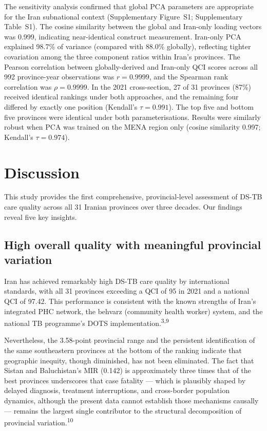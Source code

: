 \documentclass[12pt]{article}
\begin{document}
The sensitivity analysis confirmed that global PCA parameters are appropriate for the Iran subnational context (Supplementary Figure~S1; Supplementary Table~S1). The cosine similarity between the global and Iran-only loading vectors was 0.999, indicating near-identical construct measurement. Iran-only PCA explained 98.7\% of variance (compared with 88.0\% globally), reflecting tighter covariation among the three component ratios within Iran's provinces. The Pearson correlation between globally-derived and Iran-only QCI scores across all 992 province-year observations was $r = 0.9999$, and the Spearman rank correlation was $\rho = 0.9999$. In the 2021 cross-section, 27 of 31 provinces (87\%) received identical rankings under both approaches, and the remaining four differed by exactly one position (Kendall's $\tau = 0.991$). The top five and bottom five provinces were identical under both parameterisations. Results were similarly robust when PCA was trained on the MENA region only (cosine similarity 0.997; Kendall's $\tau = 0.974$).


\section{Discussion}

This study provides the first comprehensive, provincial-level assessment of DS-TB care quality across all 31 Iranian provinces over three decades. Our findings reveal five key insights.

\subsection{High overall quality with meaningful provincial variation}

Iran has achieved remarkably high DS-TB care quality by international standards, with all 31 provinces exceeding a QCI of 95 in 2021 and a national QCI of 97.42. This performance is consistent with the known strengths of Iran's integrated PHC network, the behvarz (community health worker) system, and the national TB programme's DOTS implementation.\textsuperscript{3,9}

Nevertheless, the 3.58-point provincial range and the persistent identification of the same southeastern provinces at the bottom of the ranking indicate that geographic inequity, though diminished, has not been eliminated. The fact that Sistan and Baluchistan's MIR (0.142) is approximately three times that of the best provinces underscores that case fatality --- which is plausibly shaped by delayed diagnosis, treatment interruptions, and cross-border population dynamics, although the present data cannot establish those mechanisms causally --- remains the largest single contributor to the structural decomposition of provincial variation.\textsuperscript{10}
\end{document}
